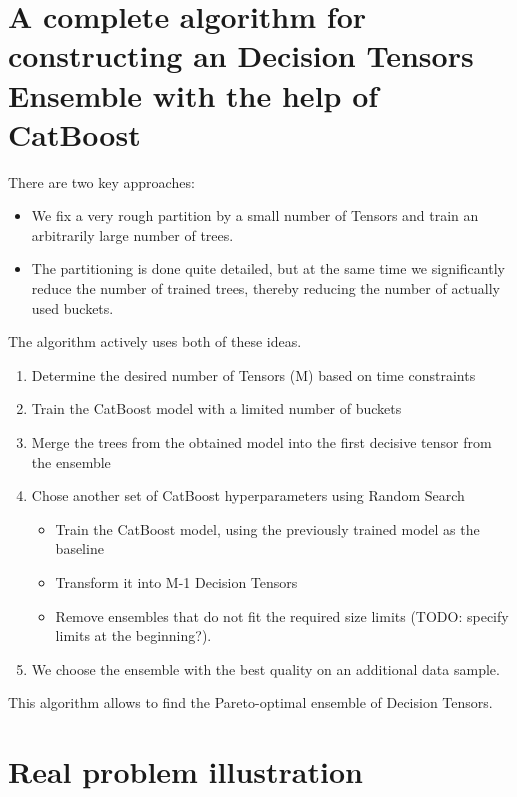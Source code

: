 \documentclass[a4paper]{jpconf}
\begin{document}
\section{A complete algorithm for constructing an Decision Tensors Ensemble with the help of CatBoost}

There are two key approaches:

\medskip
\begin{itemize}
\item We fix a very rough partition by a small number of Tensors and train an arbitrarily large number of trees.
\item The partitioning is done quite detailed, but at the same time we significantly reduce the number of trained trees, thereby reducing the number of actually used buckets.
\end{itemize}

The algorithm actively uses both of these ideas.

\medskip
\renewcommand{\theenumi}{\arabic{enumi}}
\begin{enumerate}
\item Determine the desired number of Tensors (M) based on time constraints
\item Train the CatBoost model with a limited number of buckets
\item Merge the trees from the obtained model into the first decisive tensor from the ensemble
\item Chose another set of CatBoost hyperparameters using Random Search
\medskip
\begin{itemize}
\item Train the CatBoost model, using the previously trained model as the baseline
\item Transform it into M-1 Decision Tensors
\item Remove ensembles that do not fit the required size limits (TODO: specify limits at the beginning?).
\end{itemize}
\item We choose the ensemble with the best quality on an additional data sample.
\end{enumerate}

This algorithm allows to find the Pareto-optimal ensemble of Decision Tensors.

\section{Real problem illustration}
\end{document}
